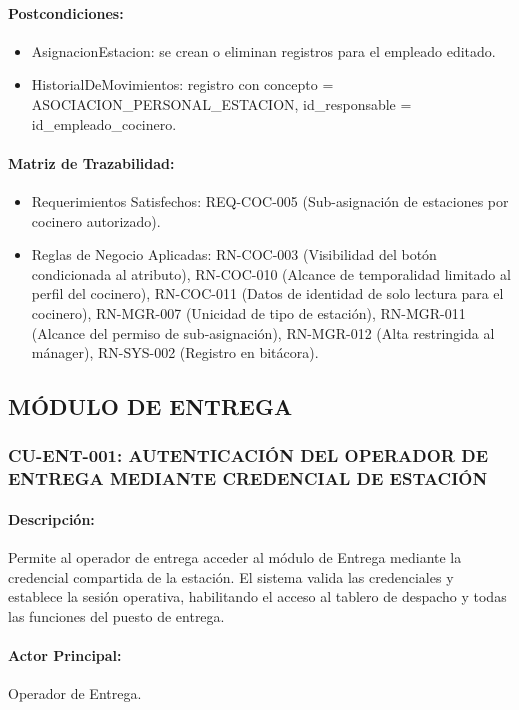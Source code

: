 \paragraph{Postcondiciones:}
\begin{itemize}
    \item AsignacionEstacion: se crean o eliminan registros para el empleado editado.
    \item HistorialDeMovimientos: registro con concepto = ASOCIACION\_PERSONAL\_ESTACION, id\_responsable = id\_empleado\_cocinero.
\end{itemize}

\paragraph{Matriz de Trazabilidad:}
\begin{itemize}
    \item Requerimientos Satisfechos: REQ-COC-005 (Sub-asignación de estaciones por cocinero autorizado).
    \item Reglas de Negocio Aplicadas: RN-COC-003 (Visibilidad del botón condicionada al atributo), RN-COC-010 (Alcance de temporalidad limitado al perfil del cocinero), RN-COC-011 (Datos de identidad de solo lectura para el cocinero), RN-MGR-007 (Unicidad de tipo de estación), RN-MGR-011 (Alcance del permiso de sub-asignación), RN-MGR-012 (Alta restringida al mánager), RN-SYS-002 (Registro en bitácora).
\end{itemize}

\subsection{MÓDULO DE ENTREGA}
\subsubsection{CU-ENT-001: AUTENTICACIÓN DEL OPERADOR DE ENTREGA MEDIANTE CREDENCIAL DE ESTACIÓN}
\paragraph{Descripción:} Permite al operador de entrega acceder al módulo de Entrega mediante la credencial compartida de la estación. El sistema valida las credenciales y establece la sesión operativa, habilitando el acceso al tablero de despacho y todas las funciones del puesto de entrega.

\paragraph{Actor Principal:} Operador de Entrega.

